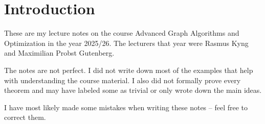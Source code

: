 
\section*{Introduction}

These are my lecture notes on the course Advanced Graph Algorithms and Optimization in the
year 2025/26. The lecturers that year were Rasmus Kyng and Maximilian Probst Gutenberg.

The notes are not perfect. I did not write down most of the examples
that help with understanding the course material. I also did not
formally prove every theorem and may have labeled some as trivial or
only wrote down the main ideas.

I have most likely made some mistakes when writing these notes --
feel free to correct them.
